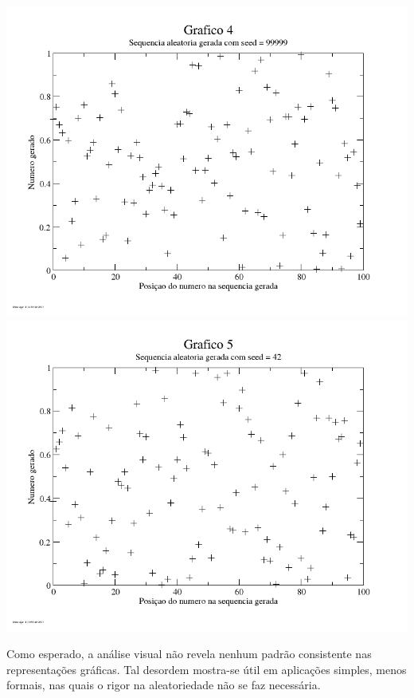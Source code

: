 \documentclass{article}
\begin{document}
\includegraphics[width=\textwidth]{graf4}
\includegraphics[width=\textwidth]{graf5}

Como esperado, a análise visual não revela nenhum padrão consistente nas representações gráficas. Tal desordem mostra-se útil em aplicações simples, menos formais, nas quais o rigor na aleatoriedade não se faz necessária.
\end{document}
